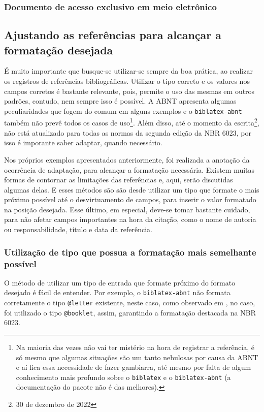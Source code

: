 
\subsubsection{Documento de acesso exclusivo em meio eletrônico}





\subsection{Ajustando as referências para alcançar a formatação desejada}
É muito importante que busque-se utilizar-se sempre da boa prática, ao realizar os registros de referências bibliográficas. Utilizar o tipo correto e os valores nos campos corretos é bastante relevante, pois, permite o uso das mesmas em outros padrões, contudo, nem sempre isso é possível. A ABNT apresenta algumas peculiaridades que fogem do comum em alguns exemplos e o \texttt{biblatex-abnt} também não prevê todos os casos de uso\footnote{Na maioria das vezes não vai ter mistério na hora de registrar a referência, é só mesmo que algumas situações são um tanto nebulosas por causa da ABNT e aí fica essa necessidade de fazer gambiarra, até mesmo por falta de algum conhecimento mais profundo sobre o \texttt{biblatex} e o \texttt{biblatex-abnt} (a documentação do pacote não é das melhores).}. Além disso, até o momento da escrita\footnote{30 de dezembro de 2022}, não está atualizado para todas as normas da segunda edição da NBR 6023, por isso é imporante saber adaptar, quando necessário. 

Nos próprios exemplos apresentados anteriormente, foi realizada a anotação da ocorrência de adaptação, para alcançar a formatação necessária. Existem muitas formas de contornar as limitações das referências e, aqui, serão discutidas algumas delas. E esses métodos são são desde utilizar um tipo que formate o mais próximo possível até o desvirtuamento de campos, para inserir o valor formatado na posição desejada. Esse último, em especial, deve-se tomar bastante cuidado, para não afetar campos importantes na hora da citação, como o nome de autoria ou responsabilidade, título e data da referência.

\subsubsection{Utilização de tipo que possua a formatação mais semelhante possível}
O método de utilizar um tipo de entrada que formate próximo do formato desejado é fácil de entender. Por exemplo, o \texttt{biblatex-abnt} não formata corretamente o tipo \texttt{@letter} existente, neste caso, como observado em \textcite{correspondencia:ex1}, no caso, foi utilizado o tipo \texttt{@booklet}, assim, garantindo a formatação destacada na NBR 6023. 

